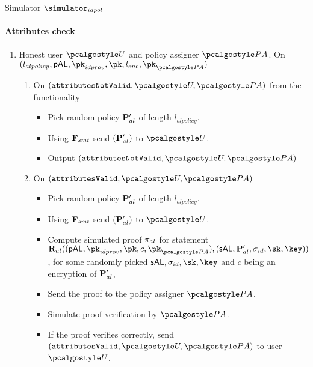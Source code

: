 \documentclass[runningheads,10pt]{llncs}
\numberwithin{equation}{section}
\begin{document}
\begin{simbox}{Simulator $\simulator_{idpol}$}
  \paragraph{Attributes check}
  \begin{enumerate}
  \item Honest user $\user$ and policy assigner $\polas$. On $(l_{alpolicy}, \pAL,
    \pk_{idprov}, \pk, l_{enc}, \pk_{\polas})$
    \begin{enumerate}
    \item On $(\attributesNotValid, \user,
    \polas)$ from the functionality 
    \begin{itemize}
    \item Pick random policy $\mathbf{P}_{al}'$ of length $l_{alpolicy}$.
    \item Using $\mathbf{F}_{{smt}}$ send $(\mathbf{P}_{al}')$ to $\user$.
    \item Output $(\attributesNotValid, \user, \polas)$
    \end{itemize}
    \item On $(\attributesValid, \user, \polas)$
    \begin{itemize}
    \item Pick random policy $\mathbf{P}_{al}'$ of length $l_{alpolicy}$.
    \item Using $\mathbf{F}_{{smt}}$ send $(\mathbf{P}_{al}')$ to $\user$.
    \item Compute simulated proof $\mathsf{\pi}_{al}$ for statement
      $\REL_{al} ((\pAL, \pk_{idprov}, \pk, c, \pk_{\polas}), (\sAL, \alpolicy',
      \signature_{id}, \sk, \key))$, for some randomly picked
      $\sAL, \signature_{id}, \sk, \key$ and $c$ being an encryption of
      $\mathbf{P}_{al}'$,
    \item Send the proof to the policy assigner $\polas$.
    \item Simulate proof verification by $\polas$.
    \item If the proof verifies correctly, send $(\attributesValid, \user, \polas)$ to user
      $\user$.
    \end{itemize}
  \end{enumerate}


\end{enumerate}
\end{simbox}
\end{document}
